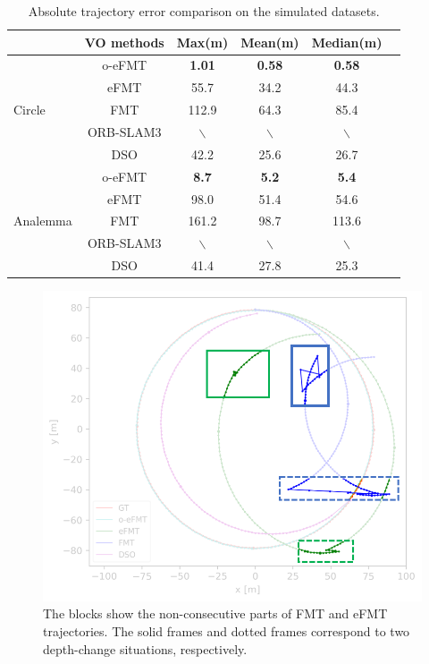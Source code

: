 \documentclass[letterpaper, 10 pt, conference]{ieeeconf}  %
\begin{document}
\begin{table}[t]
    \centering
    \caption{Absolute trajectory error comparison on the simulated datasets.}
    \label{tab:simError_tab}
    \begin{tabular}{lccccr}
    \toprule
        & \textbf{VO methods} & \textbf{Max(m)} & \textbf{Mean(m)}& \textbf{Median(m)}\\ \midrule
       & o-eFMT & \textbf{1.01} & \textbf{0.58} & \textbf{0.58} \\
      & eFMT & 55.7 & 34.2 & 44.3  \\ 
       Circle & FMT & 112.9 & 64.3 & 85.4 \\
       & ORB-SLAM3 & $\backslash$ & $\backslash$ & $\backslash$ \\
       & DSO & 42.2 & 25.6 & 26.7 \\
    \midrule
       & o-eFMT & \textbf{8.7} & \textbf{5.2} & \textbf{5.4} \\
     & eFMT& 98.0 & 51.4 & 54.6  \\ 
     Analemma    & FMT & 161.2 & 98.7 & 113.6 \\
       & ORB-SLAM3 & $\backslash$ & $\backslash$ & $\backslash$ \\
       & DSO & 41.4 & 27.8 & 25.3 \\
    \bottomrule
    \end{tabular}
\end{table}

\begin{figure}[t]
    \centering
   \includegraphics[width=1\linewidth]{./images_exp/fragment.png}
    \caption{The blocks show the non-consecutive parts of FMT and eFMT trajectories. The solid frames and dotted frames correspond to two depth-change situations, respectively.}
    \label{fig:fragment}
\end{figure}
\end{document}
